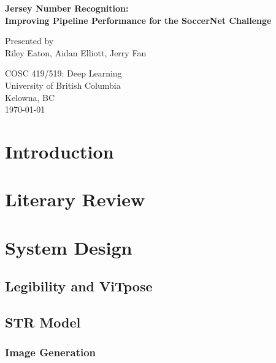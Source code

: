 \documentclass[11pt, letterpaper]{article}
\begin{document}
\begin{titlepage}
  \begin{center}
      \vspace*{1cm}
      
      \fontsize{14}{14}\textbf{Jersey Number Recognition:} \\
      \vspace{0.1cm}
      \fontsize{14}{14}\textbf{Improving Pipeline Performance for the SoccerNet Challenge}
      
      \vspace{0.5cm}
      Presented by \\
      Riley Eaton, Aidan Elliott, Jerry Fan
      
      \vfill
          
      COSC 419/519: Deep Learning \\
      University of British Columbia \\
      Kelowna, BC \\
      \today
          
  \end{center}
\end{titlepage}

\clearpage
\section{Introduction}

\section{Literary Review}


\section{System Design}

\subsection{Legibility and ViTpose}

\subsection{STR Model}

\subsubsection{Image Generation}
\end{document}
